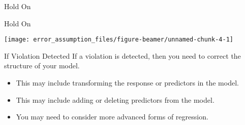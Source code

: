 \begin{frame}[fragile]{Hold On}
\protect\hypertarget{hold-on}{}
\begin{Shaded}
\begin{Highlighting}[]
\StringTok{ }\NormalTok{(}\OperatorTok{{-}}\NormalTok{,}\NormalTok{,} \NormalTok{)}
\StringTok{ }\OperatorTok{*}\OperatorTok{+}\StringTok{ }\NormalTok{(}\NormalTok{, } \NormalTok{)}
\StringTok{ }\OperatorTok{\textasciitilde{}}
\OperatorTok{$}\OperatorTok{\textasciitilde{}}\StringTok{ } \NormalTok{, } \NormalTok{, }\NormalTok{)}
\NormalTok{(}\NormalTok{,}\NormalTok{,}\NormalTok{)}
\end{Highlighting}
\end{Shaded}
\end{frame}

\begin{frame}{Hold On}
\protect\hypertarget{hold-on-1}{}
\begin{center}\texttt{[image: error\_assumption\_files/figure-beamer/unnamed-chunk-4-1]} \end{center}
\end{frame}

\begin{frame}{If Violation Detected}
\protect\hypertarget{if-violation-detected}{}
If a violation is detected, then you need to correct the structure of
your model.

\begin{itemize}
\tightlist
\item
  This may include transforming the response or predictors in the model.
\item
  This may include adding or deleting predictors from the model.
\item
  You may need to consider more advanced forms of regression.
\end{itemize}
\end{frame}


